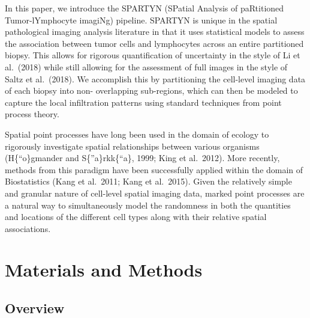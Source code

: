 \documentclass[
]{book}
\begin{document}
In this paper, we introduce the SPARTYN (SPatial Analysis of paRtitioned
Tumor-lYmphocyte imagiNg) pipeline. SPARTYN is unique in the spatial
pathological imaging analysis literature in that it uses statistical
models to assess the association between tumor cells and lymphocytes
across an entire partitioned biopsy. This allows for rigorous
quantification of uncertainty in the style of Li et al.~(2018) while
still allowing for the assessment of full images in the style of Saltz
et al.~(2018). We accomplish this by partitioning the cell-level imaging
data of each biopsy into non- overlapping sub-regions, which can then be
modeled to capture the local infiltration patterns using standard
techniques from point process theory.

Spatial point processes have long been used in the domain of ecology to
rigorously investigate spatial relationships between various organisms
(H\{``o\}gmander and S\{''a\}rkk\{``a\}, 1999; King et al.~2012). More recently,
methods from this paradigm have been successfully applied within the
domain of Biostatistics (Kang et al.~2011; Kang et al.~2015). Given the
relatively simple and granular nature of cell-level spatial imaging
data, marked point processes are a natural way to simultaneously model
the randomness in both the quantities and locations of the different
cell types along with their relative spatial associations.

\hypertarget{materials-and-methods}{%
\chapter{Materials and Methods}\label{materials-and-methods}}

\hypertarget{overview}{%
\section{Overview}\label{overview}}
\end{document}
